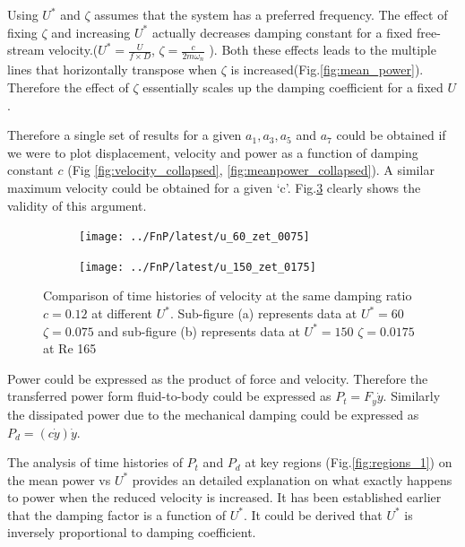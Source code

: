  Using $U^*$ and $\zeta$ assumes that the system has a preferred frequency. The effect of fixing $\zeta$ and increasing $U^*$ actually decreases damping constant for a fixed free-stream velocity.($U^*=\frac{U}{f \times D}$, $\zeta= \frac{c}{2 m \omega_n}$ ). Both these effects leads to the multiple lines that horizontally transpose when $\zeta$ is increased(Fig.\ref{fig:mean_power}). Therefore the effect of $\zeta$ essentially scales up the damping coefficient for a fixed $U$. 
 \vspace{1cm}
 
 Therefore a single set of results for a given $a_1,a_3, a_5$ and $a_7$ could be obtained if we were to plot displacement, velocity and power as a function of damping constant $c$ (Fig \ref{fig:velocity_collapsed}, \ref{fig:meanpower_collapsed}). A similar maximum velocity could be obtained for a given `c'. Fig.\ref{fig:same_max_vel} clearly shows the validity of this argument. 


 
 \begin{figure}[h!]
 \begin{subfigure}[b]{0.5\textwidth}
 \centering
 \label{fig:u_60_zet_0075}
 \texttt{[image: ../FnP/latest/u\_60\_zet\_0075]}
 \caption{}
 \end{subfigure}
 
 \begin{subfigure}[b]{0.5\textwidth}
 \centering
 \label{fig:u_150_zet_017}
 \texttt{[image: ../FnP/latest/u\_150\_zet\_0175]}
 \caption{}
 \end{subfigure}
 \caption{Comparison of time histories of velocity at the same damping ratio $c=0.12$ at different $U^*$. Sub-figure (a) represents data at $U^*=60$ $\zeta=0.075$ and sub-figure (b) represents data at $U^*=150$ $\zeta=0.0175$ at Re 165 }
 \label{fig:same_max_vel}
 \end{figure}
 
 
 
 
 
 Power could be expressed as the product of force and velocity. Therefore the transferred power form fluid-to-body could be expressed as $P_t=F_y\dot{y}$. Similarly the dissipated power due to the mechanical damping could be expressed as $P_d=(c\dot{y})\dot{y}.$

The analysis of time histories of $P_t $ and $P_d$ at key regions (Fig.\ref{fig:regions_1}) on the mean power vs $U^*$ provides an detailed explanation on what exactly happens to power when the reduced velocity is increased. It has been established earlier that the damping factor is a function of $U^*$. It could be derived that $U^*$ is inversely proportional to damping coefficient. 


